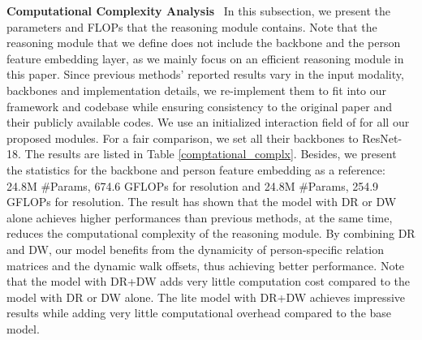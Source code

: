 \documentclass[10pt,twocolumn,letterpaper]{article}
\begin{document}
\textbf{Computational Complexity Analysis} \ In this subsection, we present the parameters and FLOPs that the reasoning module contains. Note that the reasoning module that we define does not include the backbone and the person feature embedding layer, as we mainly focus on an efficient reasoning module in this paper. Since previous methods' reported results vary in the input modality, backbones and implementation details, we re-implement them to fit into our framework and codebase while ensuring consistency to the original paper and their publicly available codes. We use an initialized interaction field of  for all our proposed modules. For a fair comparison, we set all their backbones to ResNet-18. The results are listed in Table \ref{comptational_complx}. Besides, we present the statistics for the backbone and person feature embedding as a reference: 24.8M \#Params, 674.6 GFLOPs for  resolution and 24.8M \#Params, 254.9 GFLOPs for  resolution. The result has shown that the model with DR or DW alone achieves higher performances than previous methods, at the same time, reduces the computational complexity of the reasoning module. By combining DR and DW, our model benefits from the dynamicity of person-specific relation matrices and the dynamic walk offsets, thus achieving better performance. Note that the model with DR+DW adds very little computation cost compared to the model with DR or DW alone. The lite model with DR+DW achieves impressive results while adding very little computational overhead compared to the base model. 
\end{document}
